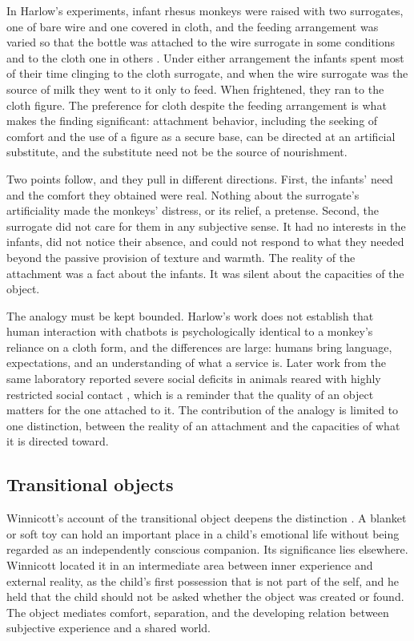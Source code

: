 \documentclass[11pt]{article}
\begin{document}
In Harlow's experiments, infant rhesus monkeys were raised with two surrogates, one of bare wire and one covered in cloth, and the feeding arrangement was varied so that the bottle was attached to the wire surrogate in some conditions and to the cloth one in others \cite{harlow1958}. Under either arrangement the infants spent most of their time clinging to the cloth surrogate, and when the wire surrogate was the source of milk they went to it only to feed. When frightened, they ran to the cloth figure. The preference for cloth despite the feeding arrangement is what makes the finding significant: attachment behavior, including the seeking of comfort and the use of a figure as a secure base, can be directed at an artificial substitute, and the substitute need not be the source of nourishment.

Two points follow, and they pull in different directions. First, the infants' need and the comfort they obtained were real. Nothing about the surrogate's artificiality made the monkeys' distress, or its relief, a pretense. Second, the surrogate did not care for them in any subjective sense. It had no interests in the infants, did not notice their absence, and could not respond to what they needed beyond the passive provision of texture and warmth. The reality of the attachment was a fact about the infants. It was silent about the capacities of the object.

The analogy must be kept bounded. Harlow's work does not establish that human interaction with chatbots is psychologically identical to a monkey's reliance on a cloth form, and the differences are large: humans bring language, expectations, and an understanding of what a service is. Later work from the same laboratory reported severe social deficits in animals reared with highly restricted social contact \cite{harlow1965}, which is a reminder that the quality of an object matters for the one attached to it. The contribution of the analogy is limited to one distinction, between the reality of an attachment and the capacities of what it is directed toward.

\subsection{Transitional objects}

Winnicott's account of the transitional object deepens the distinction \cite{winnicott1953}. A blanket or soft toy can hold an important place in a child's emotional life without being regarded as an independently conscious companion. Its significance lies elsewhere. Winnicott located it in an intermediate area between inner experience and external reality, as the child's first possession that is not part of the self, and he held that the child should not be asked whether the object was created or found. The object mediates comfort, separation, and the developing relation between subjective experience and a shared world.
\end{document}
